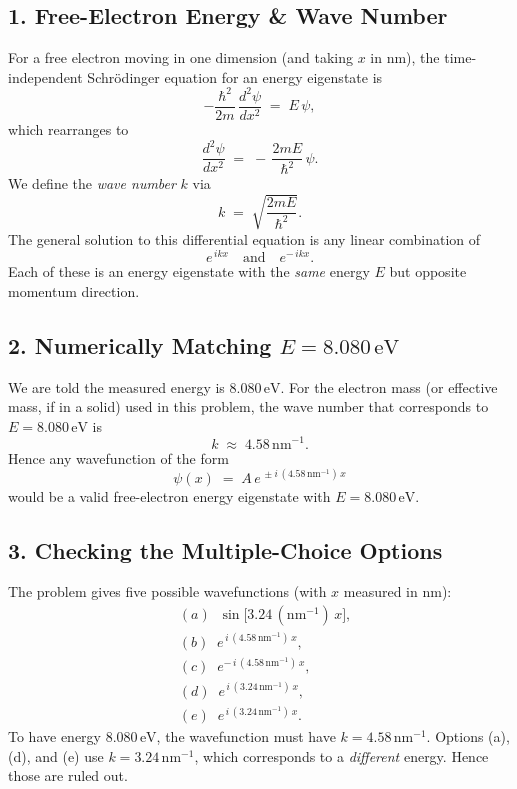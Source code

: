 \documentclass[12pt]{article}
\theoremstyle{definition} %
\theoremstyle{plain} %
\begin{document}
\subsection*{1. Free-Electron Energy \& Wave Number}

For a free electron moving in one dimension (and taking $x$ in nm), 
the time-independent Schr\"odinger equation for an energy eigenstate is
\[
-\frac{\hbar^2}{2m}\,\frac{d^2\psi}{dx^2} \;=\; E\,\psi,
\]
which rearranges to
\[
\frac{d^2\psi}{dx^2} \;=\; -\,\frac{2mE}{\hbar^2}\,\psi.
\]
We define the \emph{wave number} $k$ via
\[
k \;=\; \sqrt{\frac{2mE}{\hbar^2}}.
\]
The general solution to this differential equation is any linear combination of
\[
e^{\,i k x}
\quad\text{and}\quad
e^{-\,i k x}.
\]
Each of these is an energy eigenstate with the \emph{same} energy $E$ but opposite momentum direction.

\subsection*{2. Numerically Matching $E=8.080\,\text{eV}$}

We are told the measured energy is $8.080\,\text{eV}$.  
For the electron mass (or effective mass, if in a solid) used in this problem, 
the wave number that corresponds to $E=8.080\,\text{eV}$ is
\[
k \;\approx\; 4.58\,\text{nm}^{-1}.
\]
Hence any wavefunction of the form
\[
\psi(x) \;=\; A\,e^{\,\pm i\,(4.58\,\text{nm}^{-1})\,x}
\]
would be a valid free-electron energy eigenstate with $E=8.080\,\text{eV}$.  

\subsection*{3. Checking the Multiple-Choice Options}

The problem gives five possible wavefunctions (with $x$ measured in nm):
\[
\begin{aligned}
&(a)\;\;\sin\bigl[3.24\,(\mathrm{nm}^{-1})\,x\bigr], \\
&(b)\;\;e^{\,i\,(4.58\,\mathrm{nm}^{-1})\,x}, \\
&(c)\;\;e^{-\,i\,(4.58\,\mathrm{nm}^{-1})\,x}, \\
&(d)\;\;e^{\,i\,(3.24\,\mathrm{nm}^{-1})\,x}, \\
&(e)\;\;e^{\,i\,(3.24\,\mathrm{nm}^{-1})\,x}.
\end{aligned}
\]
To have energy $8.080\,\text{eV}$, the wavefunction must have 
\(\displaystyle k=4.58\,\mathrm{nm}^{-1}\).  
Options (a), (d), and (e) use $k=3.24\,\mathrm{nm}^{-1}$, 
which corresponds to a \emph{different} energy. 
Hence those are ruled out.
\end{document}
